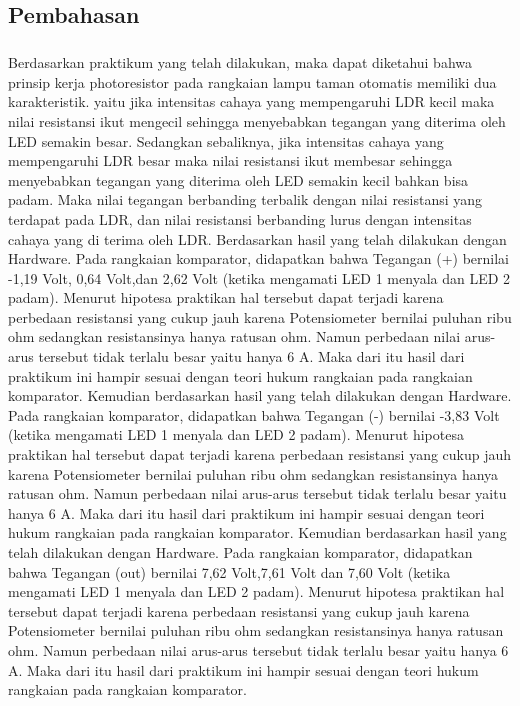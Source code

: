 \documentclass[12pt,a4paper]{article}
\begin{document}
\subsection{Pembahasan}
\subparagraph{ }
	Berdasarkan praktikum yang telah dilakukan, maka dapat diketahui bahwa prinsip kerja photoresistor pada rangkaian lampu taman otomatis memiliki dua karakteristik. yaitu jika intensitas cahaya yang mempengaruhi LDR kecil maka nilai resistansi ikut mengecil sehingga menyebabkan tegangan yang diterima oleh LED semakin besar. Sedangkan sebaliknya, jika intensitas cahaya yang mempengaruhi LDR besar maka nilai resistansi ikut membesar sehingga menyebabkan tegangan yang diterima oleh LED semakin kecil bahkan bisa padam. Maka nilai tegangan berbanding terbalik dengan nilai resistansi yang terdapat pada LDR, dan nilai resistansi berbanding lurus dengan intensitas cahaya yang di terima oleh LDR.
	Berdasarkan hasil yang telah dilakukan dengan Hardware. Pada rangkaian komparator, didapatkan bahwa Tegangan (+) bernilai -1,19 Volt, 0,64 Volt,dan 2,62 Volt (ketika mengamati LED 1 menyala dan LED 2 padam). Menurut hipotesa praktikan hal tersebut dapat terjadi karena perbedaan resistansi yang cukup jauh karena Potensiometer bernilai puluhan ribu ohm sedangkan resistansinya hanya ratusan ohm. Namun perbedaan nilai arus-arus tersebut tidak terlalu besar yaitu hanya 6 A. Maka dari itu hasil dari praktikum ini hampir sesuai dengan teori hukum rangkaian pada rangkaian komparator.
	Kemudian berdasarkan hasil yang telah dilakukan dengan Hardware. Pada rangkaian komparator, didapatkan bahwa Tegangan (-) bernilai -3,83 Volt (ketika mengamati LED 1 menyala dan LED 2 padam). Menurut hipotesa praktikan hal tersebut dapat terjadi karena perbedaan resistansi yang cukup jauh karena Potensiometer bernilai puluhan ribu ohm sedangkan resistansinya hanya ratusan ohm. Namun perbedaan nilai arus-arus tersebut tidak terlalu besar yaitu hanya 6 A. Maka dari itu hasil dari praktikum ini hampir sesuai dengan teori hukum rangkaian pada rangkaian komparator.
	Kemudian berdasarkan hasil yang telah dilakukan dengan Hardware. Pada rangkaian komparator, didapatkan bahwa Tegangan (out) bernilai 7,62 Volt,7,61 Volt dan 7,60 Volt (ketika mengamati LED 1 menyala dan LED 2 padam). Menurut hipotesa praktikan hal tersebut dapat terjadi karena perbedaan resistansi yang cukup jauh karena Potensiometer bernilai puluhan ribu ohm sedangkan resistansinya hanya ratusan ohm. Namun perbedaan nilai arus-arus tersebut tidak terlalu besar yaitu hanya 6 A. Maka dari itu hasil dari praktikum ini hampir sesuai dengan teori hukum rangkaian pada rangkaian komparator.
\end{document}
